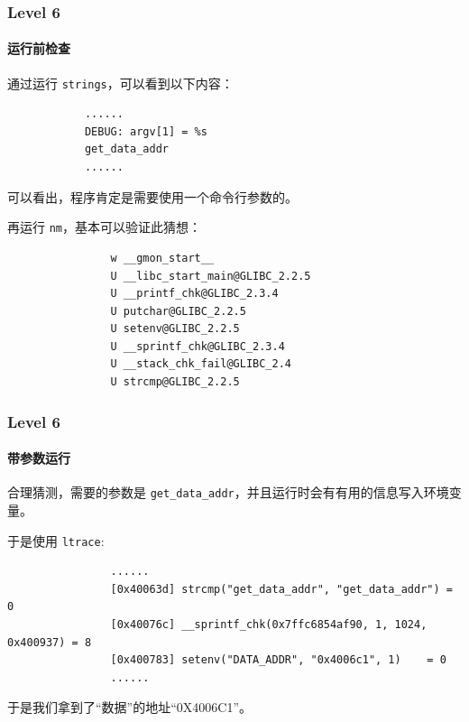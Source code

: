 \documentclass{ctexbeamer}
\begin{document}
    \begin{frame}[fragile]
        \frametitle{Level 6}
        \framesubtitle{运行前检查}
    
        通过运行 \texttt{strings}，可以看到以下内容：

        \begin{verbatim}
            ......
            DEBUG: argv[1] = %s
            get_data_addr
            ......
        \end{verbatim}

        \pause 可以看出，程序肯定是需要使用一个命令行参数的。

        再运行 \texttt{nm}，基本可以验证此猜想：

        {
            \scriptsize
            \begin{verbatim}
                w __gmon_start__
                U __libc_start_main@GLIBC_2.2.5
                U __printf_chk@GLIBC_2.3.4
                U putchar@GLIBC_2.2.5
                U setenv@GLIBC_2.2.5
                U __sprintf_chk@GLIBC_2.3.4
                U __stack_chk_fail@GLIBC_2.4
                U strcmp@GLIBC_2.2.5
            \end{verbatim}
        }
    
    \end{frame}

    \begin{frame}[fragile]
        \frametitle{Level 6}
        \framesubtitle{带参数运行}
    
        合理猜测，需要的参数是 \texttt{get_data_addr}，并且运行时会有有用的信息写入环境变量。

        于是使用 \texttt{ltrace}:

        {
            \begin{verbatim}
                ......
                [0x40063d] strcmp("get_data_addr", "get_data_addr") = 0
                [0x40076c] __sprintf_chk(0x7ffc6854af90, 1, 1024, 0x400937) = 8
                [0x400783] setenv("DATA_ADDR", "0x4006c1", 1)    = 0
                ......
            \end{verbatim}
        }

        于是我们拿到了``数据''的地址``0X4006C1''。
    
    \end{frame}
\end{document}
